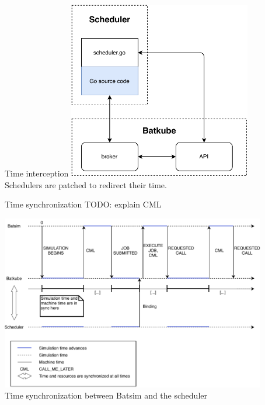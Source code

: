 \documentclass[12pt, aspectratio=43]{beamer}
\begin{document}
\begin{frame}{Time interception}
	\centering
	\includegraphics[width=0.6\textwidth]{../imgs/synchro-go-sources.pdf}\\
	\small{Schedulers are patched to redirect their time.}
\end{frame}

%		

\begin{frame}[allowframebreaks]{Time synchronization}
	TODO: explain CML
	\framebreak

	\centering
	\includegraphics[width=0.87\textwidth]{../imgs/lignes_de_temps_simple.pdf}\\
	\small{Time synchronization between Batsim and the scheduler}
\end{frame}
\end{document}
